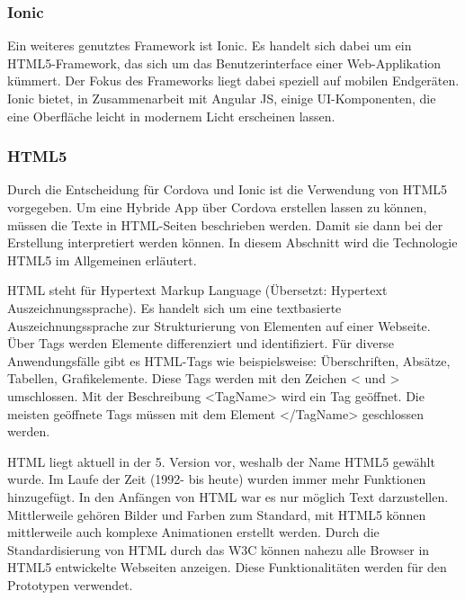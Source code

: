 \subsubsection{Ionic}
Ein weiteres genutztes Framework ist Ionic. Es handelt sich dabei um ein HTML5-Framework, das sich um das Benutzerinterface einer Web-Applikation kümmert. Der Fokus des Frameworks liegt dabei speziell auf mobilen Endgeräten.
Ionic bietet, in Zusammenarbeit mit Angular JS, einige UI-Komponenten, die eine Oberfläche leicht in modernem Licht erscheinen lassen.

\subsubsection{HTML5}

Durch die Entscheidung für Cordova und Ionic ist die Verwendung von HTML5 vorgegeben. Um eine Hybride App über Cordova erstellen lassen zu können, müssen die Texte in HTML-Seiten beschrieben werden. Damit sie dann bei der Erstellung interpretiert werden können. In diesem Abschnitt wird die Technologie HTML5 im Allgemeinen erläutert.

HTML steht für Hypertext Markup Language (Übersetzt: Hypertext Auszeichnungssprache). Es handelt sich um eine textbasierte Auszeichnungssprache zur Strukturierung von Elementen auf einer Webseite. 
Über Tags werden Elemente differenziert und identifiziert. Für diverse Anwendungsfälle gibt es HTML-Tags wie beispielsweise: Überschriften, Absätze, Tabellen, Grafikelemente.
Diese Tags werden mit den Zeichen < und > umschlossen. Mit der Beschreibung <TagName> wird ein Tag geöffnet.  Die meisten geöffnete Tags müssen mit dem Element </TagName> geschlossen werden. 

HTML liegt aktuell in der 5. Version vor, weshalb der Name HTML5 gewählt wurde. Im Laufe der Zeit (1992- bis heute) wurden immer mehr Funktionen hinzugefügt. In den Anfängen von HTML war es nur möglich Text darzustellen. Mittlerweile gehören Bilder und Farben zum Standard, mit HTML5 können mittlerweile auch komplexe Animationen erstellt werden.  Durch die Standardisierung von HTML durch das W3C können nahezu alle Browser in HTML5 entwickelte Webseiten anzeigen. Diese Funktionalitäten werden für den Prototypen verwendet.



